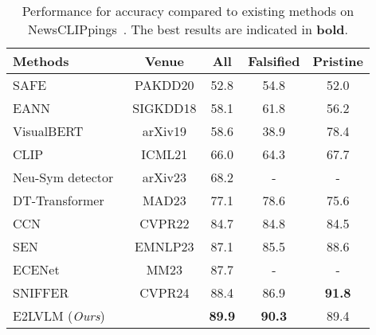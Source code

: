 \begin{table}[t]
    \caption{Performance for accuracy compared to existing methods on NewsCLIPpings~\cite{luo2021newsclippings}. The best results are indicated in \textbf{bold}.}
      \centering
      \begin{adjustbox}{valign=c, max width=\columnwidth}
      \begin{tabular}{l|c|ccc}
        \toprule
        Methods & Venue & \textbf{All} & \textbf{Falsified} & \textbf{Pristine}  \\
        \hline
        SAFE~\cite{massarelli2019safe}  & PAKDD20 & 52.8 & 54.8 & 52.0  \\
        EANN~\cite{wang2018eann}  & SIGKDD18 & 58.1 & 61.8 & 56.2  \\
        \hline
        VisualBERT~\cite{li2019visualbert}  & arXiv19 & 58.6 & 38.9 & 78.4 \\
        CLIP~\cite{radford2021learning} & ICML21  & 66.0 & 64.3 & 67.7  \\
        Neu-Sym detector~\cite{zhang2023detecting} & arXiv23 & 68.2 & - & - \\
        DT-Transformer~\cite{papadopoulos2023synthetic} & MAD23 & 77.1 & 78.6 & 75.6  \\
        CCN~\cite{abdelnabi2022open} & CVPR22 & 84.7 & 84.8 & 84.5  \\
        SEN~\cite{yuan2023support} & EMNLP23 & 87.1 & 85.5 & 88.6  \\
        ECENet~\cite{zhang2023ecenet} & MM23 & 87.7 & - & - \\
        \hline
        SNIFFER~\cite{qi2024sniffer} & CVPR24 & 88.4 & 86.9 & \textbf{91.8}  \\
        \rowcolor{lightgreen} E2LVLM (\textit{Ours}) & & \textbf{89.9} & \textbf{90.3} & 89.4  \\
        \bottomrule
  \end{tabular}
  \end{adjustbox}
  \label{tab:tab_1}
\end{table}



